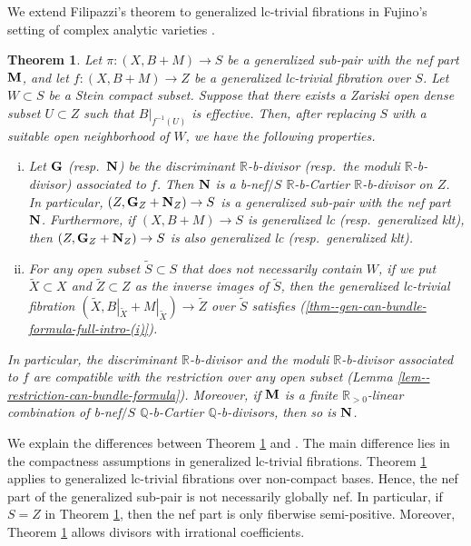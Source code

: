 \documentclass[12pt]{amsart}
\newtheorem{thm}{Theorem}[section]
\theoremstyle{definition}
\begin{document}
We extend Filipazzi's theorem to generalized lc-trivial fibrations in Fujino's setting of complex analytic varieties \cite{fujino-analytic-bchm}.  


\begin{thm}
\label{thm--gen-can-bundle-formula-full-intro}
Let $\pi \colon (X,B+M) \to S$ be a generalized sub-pair with the nef part $\boldsymbol{\rm M}$, and let $f\colon (X,B+M) \to Z$ be a generalized lc-trivial fibration over $S$. 
Let $W \subset S$ be a Stein compact subset. 
Suppose that there exists a Zariski open dense subset $U \subset Z$ such that $B|_{f^{-1}(U)}$ is effective.
Then, after replacing $S$ with a suitable open neighborhood of $W$, we have the following properties.
\begin{enumerate}[(i)]
\item \label{thm--gen-can-bundle-formula-full-intro-(i)}
Let $\boldsymbol{\rm G}$ (resp.~$\boldsymbol{\rm N}$) be the discriminant $\mathbb{R}$-b-divisor (resp.~the moduli $\mathbb{R}$-b-divisor) associated to $f$. 
Then $\boldsymbol{\rm N}$ is a b-nef$/S$ $\mathbb{R}$-b-Cartier $\mathbb{R}$-b-divisor on $Z$. 
In particular, $(Z, \boldsymbol{\rm G}_{Z} +\boldsymbol{\rm N}_{Z}) \to S$ is a generalized sub-pair with the nef part $\boldsymbol{\rm N}$. 
Furthermore, if $(X,B+M) \to S$ is generalized lc (resp.~generalized klt), then $(Z, \boldsymbol{\rm G}_{Z} +\boldsymbol{\rm N}_{Z}) \to S$ is also generalized lc (resp.~generalized klt). 
\item \label{thm--gen-can-bundle-formula-full-intro-(ii)}
For any open subset $\tilde{S} \subset S$ that does not necessarily contain $W$, if we put $\tilde{X} \subset X$ and $\tilde{Z} \subset Z$ as the inverse images of $\tilde{S}$, then the generalized lc-trivial fibration $(\tilde{X}, B|_{\tilde{X}}+M|_{\tilde{X}}) \to \tilde{Z}$ over $\tilde{S}$ satisfies (\ref{thm--gen-can-bundle-formula-full-intro-(i)}). 
\end{enumerate}
In particular, the discriminant $\mathbb{R}$-b-divisor and the moduli $\mathbb{R}$-b-divisor associated to $f$ are compatible with the restriction over any open subset (Lemma \ref{lem--restriction-can-bundle-formula}). 
Moreover, if $\boldsymbol{\rm M}$ is a finite $\mathbb{R}_{>0}$-linear combination of b-nef$/S$ $\mathbb{Q}$-b-Cartier $\mathbb{Q}$-b-divisors, then so is $\boldsymbol{\rm N}$. 
\end{thm}

We explain the differences between Theorem \ref{thm--gen-can-bundle-formula-full-intro} and \cite[Theorem 2.3]{haconpaun}. 
The main difference lies in the compactness assumptions in generalized lc-trivial fibrations. 
Theorem \ref{thm--gen-can-bundle-formula-full-intro} applies to generalized lc-trivial fibrations over non-compact bases.
Hence, the nef part of the generalized sub-pair is not necessarily globally nef. 
In particular, if $S=Z$ in Theorem \ref{thm--gen-can-bundle-formula-full-intro}, then the nef part is only fiberwise semi-positive. 
Moreover, Theorem \ref{thm--gen-can-bundle-formula-full-intro} allows divisors with irrational coefficients. 
\end{document}
